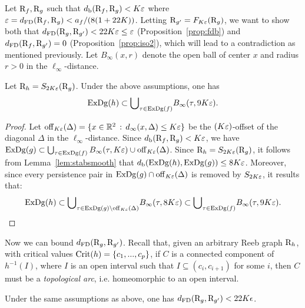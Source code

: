 Let $\mathrm{R}_f, \mathrm{R}_g$ such that $d_{\rm b}(\mathrm{R}_f, \mathrm{R}_g) < K\varepsilon$ 
where $\varepsilon=d_{\rm FD}(\mathrm{R}_f, \mathrm{R}_g)< a_f/(8(1+22K))$.  Letting
$\mathrm{R}_{g'} = F_{K\varepsilon}(\mathrm{R}_g)$, we want to show both that
$d_{\rm FD}(\mathrm{R}_g,\mathrm{R}_{g'})<22K\varepsilon\leq\varepsilon$ (Proposition~\ref{prop:fdb}) and $d_{\rm FD}(\mathrm{R}_f,\mathrm{R}_{g'})=0$ (Proposition~\ref{prop:iso2}),
which will lead to a contradiction as mentioned previously.  
Let $B_\infty(x,r)$ denote the open ball of center $x$ and radius $r>0$ in the 
$\ell_\infty$-distance.

\begin{lem}\label{lem:crit}
Let $\mathrm{R}_h=S_{2K\varepsilon}(\mathrm{R}_g)$.
Under the above assumptions, one has 
\begin{equation}\label{eq:crit}
\mathrm{ExDg}(h)\subset
{\bigcup}_{\tau\in\mathrm{ExDg}(f)} B_\infty(\tau,9K\varepsilon).
\end{equation}
\end{lem}

\begin{proof}
Let ${\rm off}_{K\varepsilon}(\Delta)=\{x\in\mathbb{R}^2\,:\,d_\infty(x,\Delta)\leq K\varepsilon\}$ be the $(K\varepsilon)$-offset
of the diagonal $\Delta$ in the $\ell_\infty$-distance.
Since $d_{\rm b}(\mathrm{R}_f,\mathrm{R}_g)<K\varepsilon$, we have
$\mathrm{ExDg}(g)\subset \bigcup_{\tau\in\mathrm{ExDg}(f)} B_\infty(\tau,K\varepsilon) \cup {\rm off}_{K\varepsilon}(\Delta)$.
Since $\mathrm{R}_h=S_{2K\varepsilon}(\mathrm{R}_g)$,
%
it follows from Lemma~\ref{lem:stabsmooth} that $d_{\rm b}(\mathrm{ExDg}(h),\mathrm{ExDg}(g))\leq 8K\varepsilon$.
Moreover, since every persistence pair in $\mathrm{ExDg}(g)\cap{\rm off}_{K\varepsilon}(\Delta)$ is removed by $S_{2K\varepsilon}$,
it results that: 
$$\mathrm{ExDg}(h)\subset{\bigcup}_{\tau\in\mathrm{ExDg}(g)\setminus {\rm off}_{K\varepsilon}(\Delta)} B_\infty(\tau,8K\varepsilon)\subset{\bigcup}_{\tau\in\mathrm{ExDg}(f)} B_\infty(\tau,9K\varepsilon).$$
\end{proof}

Now we can bound $d_{\rm FD}(\mathrm{R}_g,\mathrm{R}_{g'})$. 
Recall that, given an arbitrary Reeb graph $\mathrm{R}_h$, with critical values $\mathrm{Crit}(h)=\{c_1,...,c_p\}$,
if $C$ is a connected component of $h^{-1}(I)$, where $I$ is an open interval such that 
$I\subseteq(c_i,c_{i+1})$ for some $i$, 
then $C$ must be a {\em topological arc}, i.e. homeomorphic to an open interval.	

\begin{prop}\label{prop:fdb}
Under the same assumptions as above,  
one has $d_{\rm FD}(\mathrm{R}_g,\mathrm{R}_{g'})<22K\epsilon$.
\end{prop}


